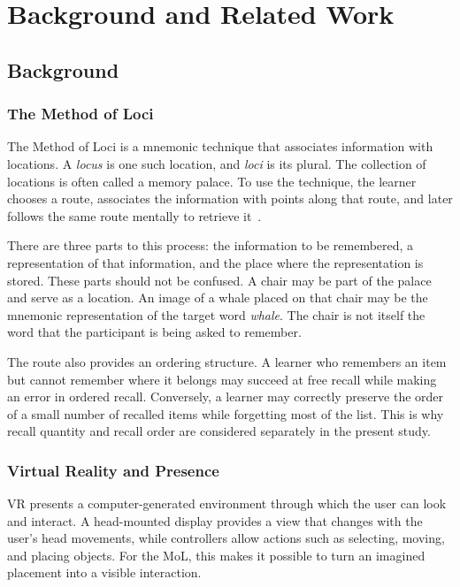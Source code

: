 \chapter{Background and Related Work}
\label{chap:backg}

\section{Background}
\subsection{The Method of Loci}
The Method of Loci is a mnemonic technique that associates information with locations. A \emph{locus} is one such location, and \emph{loci} is its plural. The collection of locations is often called a memory palace. To use the technique, the learner chooses a route, associates the information with points along that route, and later follows the same route mentally to retrieve it~\cite{moll2023,reggente2020}.

There are three parts to this process: the information to be remembered, a representation of that information, and the place where the representation is stored. These parts should not be confused. A chair may be part of the palace and serve as a location. An image of a whale placed on that chair may be the mnemonic representation of the target word \emph{whale}. The chair is not itself the word that the participant is being asked to remember.

The route also provides an ordering structure. A learner who remembers an item but cannot remember where it belongs may succeed at free recall while making an error in ordered recall. Conversely, a learner may correctly preserve the order of a small number of recalled items while forgetting most of the list. This is why recall quantity and recall order are considered separately in the present study.

\subsection{Virtual Reality and Presence}
VR presents a computer-generated environment through which the user can look and interact. A head-mounted display provides a view that changes with the user's head movements, while controllers allow actions such as selecting, moving, and placing objects. For the MoL, this makes it possible to turn an imagined placement into a visible interaction.

